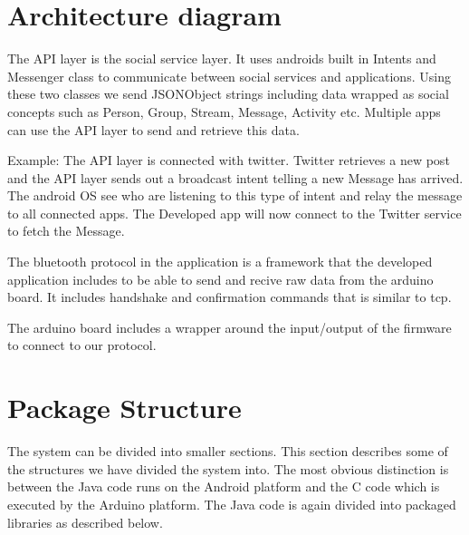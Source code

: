 \newpage

\section{Architecture diagram}
The API layer is the social service layer. It uses androids built in Intents and Messenger class to communicate between social
services and applications. Using these two classes we send JSONObject strings including data wrapped as social concepts such as Person, Group,
Stream, Message, Activity etc. Multiple apps can use the API layer to send and retrieve this data.

Example:
The API layer is connected with twitter. Twitter retrieves a new post and the API layer sends out
a broadcast intent telling a new Message has arrived. The android OS see who are listening to this type of intent and relay
the message to all connected apps. The Developed app will now connect to the Twitter service to fetch the Message.

The bluetooth protocol in the application is a framework that the developed application includes
to be able to send and recive raw data from the arduino board. It includes handshake and
confirmation commands that is similar to tcp.

The arduino board includes a wrapper around the input/output of the firmware to connect to our protocol.

\section{Package Structure}
The system can be divided into smaller sections. This section describes some of the structures
we have divided the system into. The most obvious distinction is between the Java code runs
on the Android platform and the C code which is executed by the Arduino platform.
The Java code is again divided into packaged libraries as described below.

